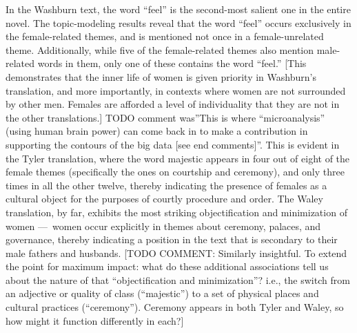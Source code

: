 \documentclass[12pt]{article}
\begin{document}
\begin{flushleft}
\begin{spacing}{2.0}
In the Washburn text, the word ``feel'' is the second-most salient one in the entire novel. The topic-modeling results reveal that the word ``feel'' occurs exclusively in the female-related themes, and is mentioned not once in a female-unrelated theme. Additionally, while five of the female-related themes also mention male-related words in them, only one of these contains the word ``feel.'' [This demonstrates that the inner life of women is given priority in Washburn’s translation, and more importantly, in contexts where women are not surrounded by other men. Females are afforded a level of individuality that they are not in the other translations.] TODO comment was''This is where ``microanalysis'' (using human brain power) can come back in to make a contribution in supporting the contours of the big data [see end comments]''. This is evident in the Tyler translation, where the word majestic appears in four out of eight of the female themes (specifically the ones on courtship and ceremony), and only three times in all the other twelve, thereby indicating the presence of females as a cultural object for the purposes of courtly procedure and order. The Waley translation, by far, exhibits the most striking objectification and minimization of women --- women occur explicitly in themes about ceremony, palaces, and governance, thereby indicating a position in the text that is secondary to their male fathers and husbands. [TODO COMMENT: Similarly insightful. To extend the point for maximum impact: what do these additional associations tell us about the nature of that ``objectification and minimization''? i.e., the switch from an adjective or quality of class (``majestic'') to a set of physical places and cultural practices (``ceremony''). Ceremony appears in both Tyler and Waley, so how might it function differently in each?]


\end{spacing}
\end{flushleft}
\end{document}
